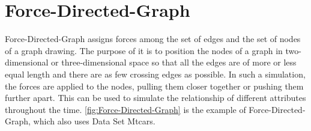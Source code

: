 \section{Force-Directed-Graph}
\label{sec:Visualization:ForceDirectedGraph}
Force-Directed-Graph\cite{force} assigns forces among the set of edges and the set of nodes of a graph drawing. The purpose of it is to position the nodes of a graph in two-dimensional or three-dimensional space so that all the edges are of more or less equal length and there are as few crossing edges as possible. In such a simulation, the forces are applied to the nodes, pulling them closer together or pushing them further apart. This can be used to simulate the relationship of different attributes throughout the time. \autoref{fig:Force-Directed-Graph} is the example of Force-Directed-Graph, which also uses Data Set Mtcars.\\

